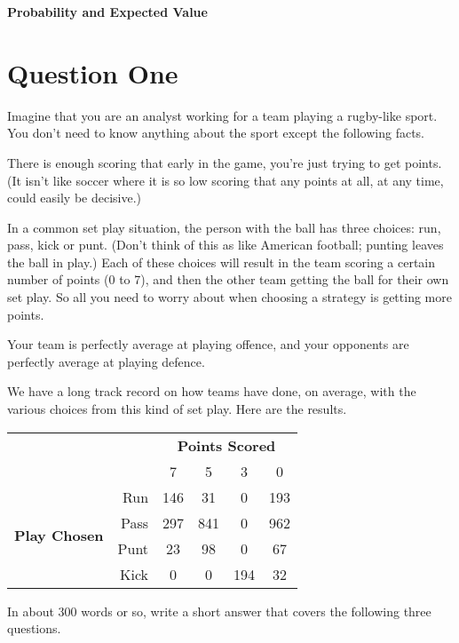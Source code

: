 \documentclass[11pt]{article}
\begin{document}
\begin{center}
{\Large \textbf{Probability and Expected Value}}
\end{center}

\section*{Question One}

Imagine that you are an analyst working for a team playing a rugby-like sport. You don't need to know anything about the sport except the following facts.

\begin{enumerate*}
\item There is enough scoring that early in the game, you're just trying to get points. (It isn't like soccer where it is so low scoring that any points at all, at any time, could easily be decisive.)
\item In a common set play situation, the person with the ball has three choices: run, pass, kick or punt. (Don't think of this as like American football; punting leaves the ball in play.) Each of these choices will result in the team scoring a certain number of points (0 to 7), and then the other team getting the ball for their own set play. So all you need to worry about when choosing a strategy is getting more points.
\item Your team is perfectly average at playing offence, and your opponents are perfectly average at playing defence.
\item We have a long track record on how teams have done, on average, with the various choices from this kind of set play. Here are the results.
\end{enumerate*}

\begin{center}
\begin{tabular}{l r | c c c c}
& & \multicolumn{4}{c}{\textbf{Points Scored}} \\
& & 7 & 5 & 3 & 0 \\ \hline
\multirow{4}{*}{\textbf{Play Chosen}} & Run & 146 & 31 & 0 & 193 \\
& Pass & 297 & 841 & 0 & 962 \\
& Punt & 23 & 98 & 0 & 67 \\
& Kick & 0 & 0 & 194 & 32
\end{tabular}
\end{center}

In about 300 words or so, write a short answer that covers the following three  questions.
\end{document}

